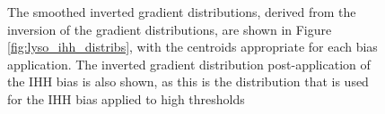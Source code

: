 \begin{figure}[ht!]
	\centering
	\caption{The smoothed inverted gradient distributions, derived from the inversion of the gradient distributions, are shown in Figure \ref{fig:lyso_ihh_distribs}, with the centroids appropriate for each bias application. The inverted gradient distribution post-application of the IHH bias is also shown, as this is the distribution that is used for the IHH bias applied to high thresholds}
	\label{fig:mito_aht_distribs}
\end{figure}

